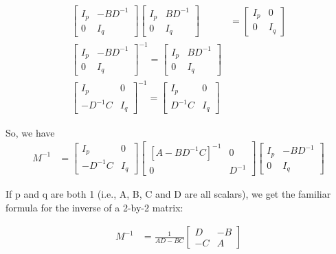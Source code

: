 \documentclass[11pt]{article} %
\begin{document}
\begin{align*}
\begin{bmatrix}
		I_{p} & -BD^{-1} \\
		0 & I_{q}
	\end{bmatrix} \begin{bmatrix}
	I_{p} & BD^{-1} \\
0 & I_{q}
\end{bmatrix} &= \begin{bmatrix} 
I_{p} & 0 \\
0 & I_{q}
\end{bmatrix}\\
\begin{bmatrix}
	I_{p} & -BD^{-1} \\
	0 & I_{q}
\end{bmatrix}^{-1} = \begin{bmatrix}
I_{p} & BD^{-1} \\
0 & I_{q}
\end{bmatrix} \\
\begin{bmatrix}
	I_{p} & 0 \\
	-D^{-1}C & I_{q}
\end{bmatrix} ^{-1} = \begin{bmatrix}
I_{p} & 0 \\
D^{-1}C & I_{q}
\end{bmatrix} 
\end{align*}

So, we have
\begin{align*}
	M^{-1} &=   \begin{bmatrix}
		I_{p} & 0 \\
		-D^{-1}C & I_{q}
	\end{bmatrix}   \begin{bmatrix}
		[A - BD^{-1}C]^{-1} & 0 \\
		0 & D^{-1}
	\end{bmatrix}  \begin{bmatrix}
	I_{p} & -BD^{-1} \\
	0 & I_{q}
\end{bmatrix}  
\end{align*}

If p and q are both 1 (i.e., A, B, C and D are all scalars), we get the familiar formula for the inverse of a 2-by-2 matrix:

\begin{align*}
	M^{-1} &= \frac{1}{AD-BC}  \begin{bmatrix}
		D & -B \\
		-C & A
	\end{bmatrix} 
\end{align*}
\end{document}
